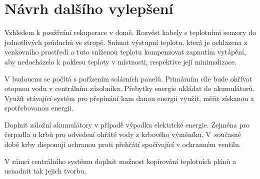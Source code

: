 \chapter{Návrh dalšího vylepšení}
Vzhledem k používání rekuperace v domě. Rozvést kabely s teplotními senzory do jednotlivých průduchů ve stropě. Snímat výstupní teplotu, která je ochlazena z venkovního prostředí a tuto sníženou teplotu kompenzovat zapnutím vytápění, aby nedocházelo k poklesu teploty v místnosti, respektive její minimalizace.

V budoucnu se počítá s pořízením solárních panelů. Primárním cíle bude ohřívat otopnou vodu v centrálním zásobníku. Přebytky energie ukládat do akumulátorů. Využít stávající systém pro přepínání kam danou energii využít, měřit získanou a spotřebovanou energii.

Doplnit záložní akumulátory v případě výpadku elektrické energie. Zejména pro čerpadla u krbů pro odvedení ohřáté vody z krbového výměníku. V~současné době krby disponují ochranou proti přehřátí spočívající v ochranném ventilu.

V rámci centrálního systému doplnit možnost kopírování teplotních plánů a usnadnit tak jejich tvorbu. 